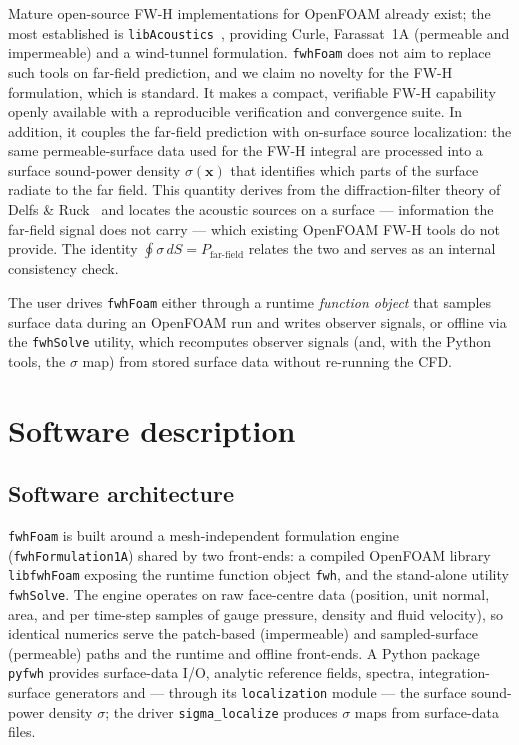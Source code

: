 \documentclass[preprint,12pt,a4paper]{elsarticle}
\begin{document}
Mature open-source FW-H implementations for OpenFOAM already exist; the most
established is \texttt{libAcoustics}~\cite{epikhin2015}, providing Curle,
Farassat~1A (permeable and impermeable) and a wind-tunnel formulation.
\texttt{fwhFoam} does not aim to replace such tools on far-field prediction,
and we claim no novelty for the FW-H formulation, which is standard. It makes
a compact, verifiable FW-H capability openly available with a reproducible
verification and convergence suite. In addition, it couples the far-field
prediction with on-surface source localization: the same permeable-surface
data used for the FW-H integral are processed into a surface sound-power
density $\sigma(\mathbf{x})$ that identifies which parts of the surface
radiate to the far field. This quantity derives from the diffraction-filter
theory of Delfs \& Ruck~\cite{delfs2024} and locates the acoustic sources on
a surface --- information the far-field signal does not carry --- which
existing OpenFOAM FW-H tools do not provide. The identity
$\oint\sigma\,dS = P_\mathrm{far\text{-}field}$ relates the two and serves as
an internal consistency check.

The user drives \texttt{fwhFoam} either through a runtime \emph{function
object} that samples surface data during an OpenFOAM run and writes observer
signals, or offline via the \texttt{fwhSolve} utility, which recomputes
observer signals (and, with the Python tools, the $\sigma$ map) from stored
surface data without re-running the CFD.

\section{Software description}
\label{sec:description}

\subsection{Software architecture}

\texttt{fwhFoam} is built around a mesh-independent formulation engine
(\texttt{fwhFormulation1A}) shared by two front-ends: a compiled OpenFOAM
library \texttt{libfwhFoam} exposing the runtime function object
\texttt{fwh}, and the stand-alone utility \texttt{fwhSolve}. The engine
operates on raw face-centre data (position, unit normal, area, and per
time-step samples of gauge pressure, density and fluid velocity), so
identical numerics serve the patch-based (impermeable) and sampled-surface
(permeable) paths and the runtime and offline front-ends. A Python package
\texttt{pyfwh} provides surface-data I/O, analytic reference fields, spectra,
integration-surface generators and --- through its \texttt{localization}
module --- the surface sound-power density $\sigma$; the driver
\texttt{sigma\_localize} produces $\sigma$ maps from surface-data files.
\end{document}
